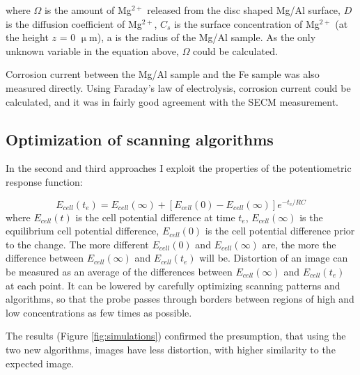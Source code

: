 where $\Omega$ is the amount of Mg$^{2+}$ released from the disc shaped Mg/Al surface, $D$ is the diffusion coefficient of Mg$^{2+}$, $C_s$ is the surface concentration of Mg$^{2+}$ (at the height $z$ = 0 $\upmu$m), a is the radius of the Mg/Al sample.
As the only unknown variable in the equation above, $\Omega$ could be calculated.

Corrosion current between the Mg/Al sample and the Fe sample was also measured directly.
Using Faraday's law of electrolysis, corrosion current could be calculated, and it was in fairly good agreement with the SECM measurement.

\subsection{Optimization of scanning algorithms}
In the second and third approaches I exploit the properties of the potentiometric response function:

\begin{equation}
\label{eq:rc}
        E_{cell}(t_{e}) = E_{cell}(\infty) + [E_{cell}(0) - E_{cell}(\infty)]e^{-t_{e}/RC}
\end{equation}
where $E_{cell}(t)$ is the cell potential difference at time $t_{e}$, $E_{cell}(\infty)$ is the equilibrium cell potential difference, $E_{cell}(0)$ is the cell potential difference prior to the change.
The more different $E_{cell}(0)$ and $E_{cell}(\infty)$ are, the more the difference between $E_{cell}(\infty)$ and $E_{cell}(t_{e})$ will be.
Distortion of an image can be measured as an average of the differences between $E_{cell}(\infty)$ and $E_{cell}(t_{e})$ at each point.
It can be lowered by carefully optimizing scanning patterns and algorithms, so that the probe passes through borders between regions of high and low concentrations as few times as possible.

The results (Figure \ref{fig:simulations}) confirmed the presumption, that using the two new algorithms, images have less distortion, with higher similarity to the expected image.

